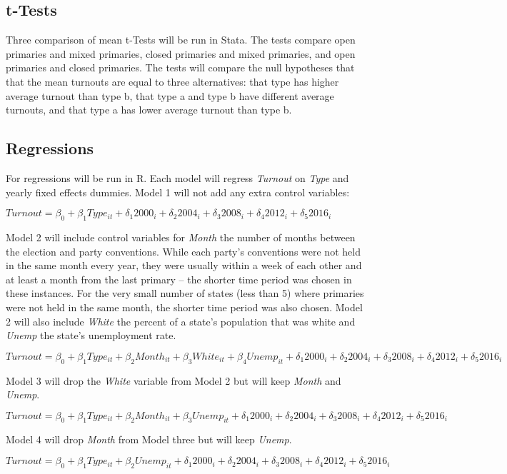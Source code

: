 \documentclass[12pt]{article}
\begin{document}
	\begin{doublespace}
	\subsection*{t-Tests}
	Three comparison of mean t-Tests will be run in Stata. The tests compare open primaries and mixed primaries, closed primaries and mixed primaries, and open primaries and closed primaries. The tests will compare the null hypotheses that that the mean turnouts are equal to three alternatives: that type has higher average turnout than type b, that type a and type b have different average turnouts, and that type a has lower average turnout than type b. 
	\subsection*{Regressions}
	For regressions will be run in R. Each model will regress \textit{Turnout} on \textit{Type} and yearly fixed effects dummies. 
	Model 1 will not add any extra control variables:
	\begin{center}
		$Turnout = \beta_{0} + \beta_{1}Type_{it} + \delta_{1}2000_{i} + \delta_{2}2004_{i} + \delta_{3}2008_{i} + \delta_{4}2012_{i} + \delta_{5}2016_{i}$\par
	\end{center}
	Model 2 will include control variables for \textit{Month} the number of months between the election and party conventions. While each party's conventions were not held in the same month every year, they were usually within a week of each other and at least a month from the last primary – the shorter time period was chosen in these instances. For the very small number of states (less than 5) where primaries were not held in the same month, the shorter time period was also chosen. Model 2 will also include \textit{White} the percent of a state's population that was white and \textit{Unemp} the state's unemployment rate. \par
	\begin{center}
		$Turnout = \beta_{0} + \beta_{1}Type_{it} + \beta_{2}Month_{it} + \beta_{3}White_{it} + \beta_{4}Unemp_{it} + \delta_{1}2000_{i} + \delta_{2}2004_{i} + \delta_{3}2008_{i} + \delta_{4}2012_{i} + \delta_{5}2016_{i}$\par
	\end{center}
	Model 3 will drop the \textit{White} variable from Model 2 but will keep \textit{Month} and \textit{Unemp}. \par
	\begin{center}
		$Turnout = \beta_{0} + \beta_{1}Type_{it} + \beta_{2}Month_{it} + \beta_{3}Unemp_{it} + \delta_{1}2000_{i} + \delta_{2}2004_{i} + \delta_{3}2008_{i} + \delta_{4}2012_{i} + \delta_{5}2016_{i}$ \par
	\end{center}
	Model 4 will drop \textit{Month} from Model three but will keep \textit{Unemp}.
	\begin{center}
		$Turnout = \beta_{0} + \beta_{1}Type_{it} + \beta_{2}Unemp_{it} + \delta_{1}2000_{i} + \delta_{2}2004_{i} + \delta_{3}2008_{i} + \delta_{4}2012_{i} + \delta_{5}2016_{i}$
	\end{center}

\end{doublespace}
\end{document}
